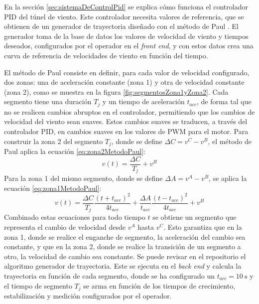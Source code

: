 En la sección \ref{sec:sistemaDeControlPid} se explica cómo funciona el controlador PID del túnel de viento. Este controlador necesita valores de referencia, que se obtienen de un generador de trayectoria diseñado con el método de Paul \cite{RoboFIUBAGenTrayec}. El generador toma de la base de datos los valores de velocidad de viento y tiempos deseados, configurados por el operador en el \textit{front end}, y con estos datos crea una curva de referencia de velocidades de viento en función del tiempo.

El método de Paul consiste en definir, para cada valor de velocidad configurado, dos zonas: una de aceleración constante (zona 1) y otra de velocidad constante (zona 2), como se muestra en la figura \ref{fig:segmentosZona1yZona2}. Cada segmento tiene una duración $T_{j}$ y un tiempo de aceleración $t_{acc}$, de forma tal que no se realicen cambios abruptos en el controlador, permitiendo que los cambios de velocidad del viento sean suaves. Estos cambios suaves se traducen, a través del controlador PID, en cambios suaves en los valores de PWM para el motor. Para construir la zona 2 del segmento $T_{j}$, donde se define $\Delta C = v^C - v^B$, el método de Paul aplica la ecuación \ref{eq:zona2MetodoPaul}:
\begin{equation}
    v(t) = \frac{\Delta C}{T_j} + v^B
    \label{eq:zona2MetodoPaul}
\end{equation}
Para la zona 1 del mismo segmento, donde se define $\Delta A = v^A - v^B$, se aplica la ecuación \ref{eq:zona1MetodoPaul}:
\begin{equation}
    v(t) = \frac{\Delta C}{T_j} \frac{(t + t_{acc})^2}{4t_{acc}} + \frac{\Delta A}{t_{acc}} \frac{(t - t_{acc})^2}{4t_{acc}} + v^B 
    \label{eq:zona1MetodoPaul}
\end{equation}
Combinado estas ecuaciones para todo tiempo $t$ se obtiene un segmento que representa el cambio de velocidad desde $v^A$ hasta $v^C$. Esto garantiza que en la zona 1, donde se realice el enganche de segmento, la aceleración del cambio sea constante, y que en la zona 2, donde se realice la transición de un segmento a otro, la velocidad de cambio sea constante. Se puede revisar en el repositorio \cite{AppGenTrayect} el algoritmo generador de trayectoria. Este se ejecuta en el \textit{back end} y calcula la trayectoria en función de cada segmento, donde se ha configurado un $t_{acc} = \SI{10}{\second}$ y el tiempo de segmento $T_{j}$ se arma en función de los tiempos de crecimiento, estabilización y medición configurados por el operador. 
